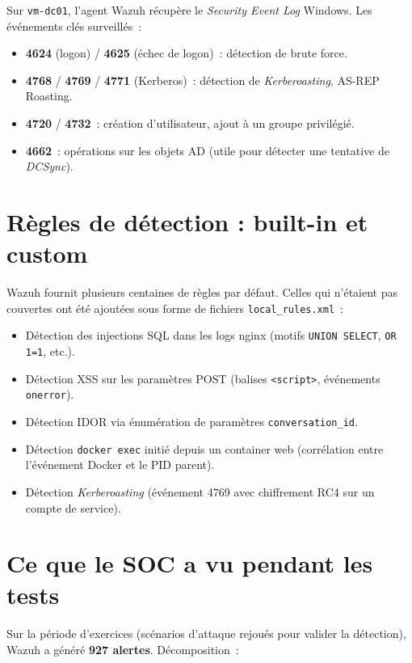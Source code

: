 Sur \texttt{vm-dc01}, l'agent Wazuh récupère le
\emph{Security Event Log} Windows. Les événements clés
surveillés~:

\begin{itemize}
  \item \textbf{4624} (logon) / \textbf{4625} (échec de logon)~:
    détection de brute force.
  \item \textbf{4768} / \textbf{4769} / \textbf{4771} (Kerberos)~:
    détection de \emph{Kerberoasting}, AS-REP Roasting.
  \item \textbf{4720} / \textbf{4732}~: création d'utilisateur,
    ajout à un groupe privilégié.
  \item \textbf{4662}~: opérations sur les objets AD (utile pour
    détecter une tentative de \emph{DCSync}).
\end{itemize}

\section{Règles de détection : built-in et custom}

Wazuh fournit plusieurs centaines de règles par défaut. Celles qui
n'étaient pas couvertes ont été ajoutées sous forme de fichiers
\texttt{local\_rules.xml}~:

\begin{itemize}
  \item Détection des injections SQL dans les logs nginx (motifs
    \texttt{UNION SELECT}, \texttt{OR 1=1}, etc.).
  \item Détection XSS sur les paramètres POST (balises
    \texttt{<script>}, événements \texttt{onerror}).
  \item Détection IDOR via énumération de paramètres
    \texttt{conversation\_id}.
  \item Détection \texttt{docker exec} initié depuis un container
    web (corrélation entre l'événement Docker et le PID
    parent).
  \item Détection \emph{Kerberoasting} (événement 4769 avec
    chiffrement RC4 sur un compte de service).
\end{itemize}

\section{Ce que le SOC a vu pendant les tests}

Sur la période d'exercices (scénarios d'attaque rejoués pour
valider la détection), Wazuh a généré \textbf{927 alertes}.
Décomposition~:

